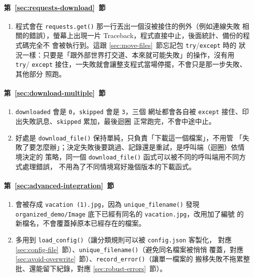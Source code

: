 \paragraph{第~\ref{sec:requests-download}~節}
\begin{enumerate}
\item 程式會在 \texttt{requests.get()} 那一行丟出一個沒被接住的例外（例如連線失敗
相關的錯誤），螢幕上出現一片 Traceback，程式直接中止，後面統計、備份的程式碼完全不
會被執行到。這跟 \ref{sec:move-files}~節忘記包 \texttt{try}/\texttt{except} 時的
狀況一樣：只要是「跟外部世界打交道、本來就可能失敗」的操作，沒有用 \texttt{try}/
\texttt{except} 接住，一失敗就會讓整支程式當場停擺，不會只是那一步失敗、其他部分
照跑。
\end{enumerate}

\paragraph{第~\ref{sec:download-multiple}~節}
\begin{enumerate}
\item \texttt{downloaded} 會是 \texttt{0}，\texttt{skipped} 會是 \texttt{3}，三個
網址都會各自被 \texttt{except} 接住、印出失敗訊息、\texttt{skipped} 累加，最後迴圈
正常跑完，不會中途中止。
\item 好處是 \texttt{download\_file()} 保持單純，只負責「下載這一個檔案」，不用管
「失敗了要怎麼辦」；決定失敗後要跳過、記錄還是重試，是呼叫端（迴圈）依情境決定的
策略，同一個 \texttt{download\_file()} 函式可以被不同的呼叫端用不同方式處理錯誤，
不用為了不同情境寫好幾個版本的下載函式。
\end{enumerate}

\paragraph{第~\ref{sec:advanced-integration}~節}
\begin{enumerate}
\item 會被存成 \texttt{vacation (1).jpg}，因為 \texttt{unique\_filename()} 發現
\texttt{organized\_demo/Image} 底下已經有同名的 \texttt{vacation.jpg}，改用加了編號
的新檔名，不會覆蓋掉原本已經存在的檔案。
\item 多用到 \texttt{load\_config()}（讓分類規則可以被 \texttt{config.json} 客製化，
對應 \ref{sec:config-file}~節）、\texttt{unique\_filename()}（避免同名檔案被悄悄
覆蓋，對應 \ref{sec:avoid-overwrite}~節）、\texttt{record\_error()}（讓單一檔案的
搬移失敗不拖累整批、還能留下紀錄，對應 \ref{sec:robust-errors}~節）。
\end{enumerate}
